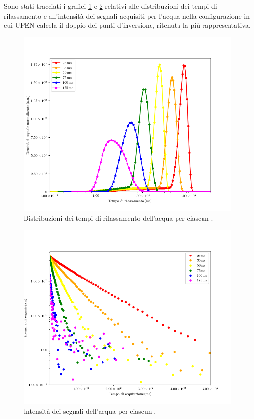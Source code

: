 Sono stati tracciati i grafici \ref{fig:D_h2o} e \ref{fig:S_h2o} relativi alle distribuzioni dei tempi di rilassamento e all'intensità dei segnali acquisiti per l'acqua nella configurazione in cui UPEN calcola il doppio dei punti d'inversione, ritenuta la più rappresentativa.

\begin{figure}[h!]
\centering
\includegraphics[scale=0.3]{Figure/H2O.png}
\caption{Distribuzioni dei tempi di rilassamento dell'acqua per ciascun \tau.}
\label{fig:D_h2o}
\end{figure}

\begin{figure}[h!]
\centering
\includegraphics[scale=0.3]{Figure/H2O_SigTSig.png}
\caption{Intensità dei segnali dell'acqua per ciascun \tau.}
\label{fig:S_h2o}
\end{figure}

